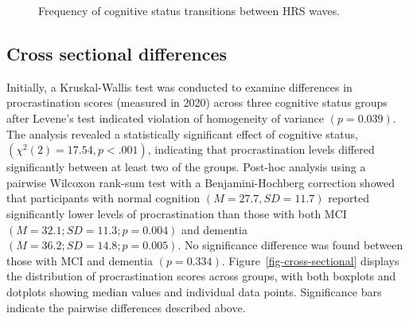 \documentclass[
]{article}
\begin{document}
\begin{figure}[H]


\caption{\label{fig-river}Frequency of cognitive status transitions
between HRS waves.}

\end{figure}%

\subsection{Cross sectional
differences}\label{cross-sectional-differences}

Initially, a Kruskal-Wallis test was conducted to examine differences in
procrastination scores (measured in 2020) across three cognitive status
groups after Levene's test indicated violation of homogeneity of
variance \((p = 0.039)\). The analysis revealed a statistically
significant effect of cognitive status,
\((\chi^2(2) = 17.54, p < .001)\), indicating that procrastination
levels differed significantly between at least two of the groups.
Post-hoc analysis using a pairwise Wilcoxon rank-sum test with a
Benjamini-Hochberg correction showed that participants with normal
cognition \((M = 27.7, SD = 11.7)\) reported significantly lower levels
of procrastination than those with both MCI
\((M = 32.1; SD = 11.3; p = 0.004)\) and dementia
\((M = 36.2; SD = 14.8; p = 0.005)\). No significance difference was
found between those with MCI and dementia \((p = 0.334)\).
Figure~\ref{fig-cross-sectional} displays the distribution of
procrastination scores across groups, with both boxplots and dotplots
showing median values and individual data points. Significance bars
indicate the pairwise differences described above.
\end{document}
